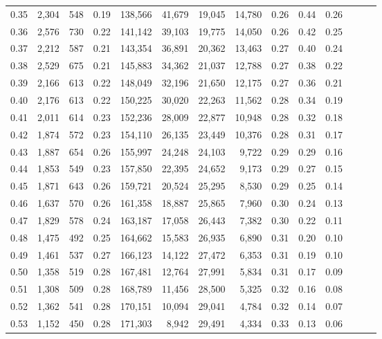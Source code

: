 \begin{tabular}{rrrrrrrrrrrrrr}
0.35 &  2,304 &    548 &  0.19 &  138,566 &   41,679 &  19,045 &  14,780 &  0.26 &  0.44 &      0.26 \\
0.36 &  2,576 &    730 &  0.22 &  141,142 &   39,103 &  19,775 &  14,050 &  0.26 &  0.42 &      0.25 \\
0.37 &  2,212 &    587 &  0.21 &  143,354 &   36,891 &  20,362 &  13,463 &  0.27 &  0.40 &      0.24 \\
0.38 &  2,529 &    675 &  0.21 &  145,883 &   34,362 &  21,037 &  12,788 &  0.27 &  0.38 &      0.22 \\
0.39 &  2,166 &    613 &  0.22 &  148,049 &   32,196 &  21,650 &  12,175 &  0.27 &  0.36 &      0.21 \\
0.40 &  2,176 &    613 &  0.22 &  150,225 &   30,020 &  22,263 &  11,562 &  0.28 &  0.34 &      0.19 \\
0.41 &  2,011 &    614 &  0.23 &  152,236 &   28,009 &  22,877 &  10,948 &  0.28 &  0.32 &      0.18 \\
0.42 &  1,874 &    572 &  0.23 &  154,110 &   26,135 &  23,449 &  10,376 &  0.28 &  0.31 &      0.17 \\
0.43 &  1,887 &    654 &  0.26 &  155,997 &   24,248 &  24,103 &   9,722 &  0.29 &  0.29 &      0.16 \\
0.44 &  1,853 &    549 &  0.23 &  157,850 &   22,395 &  24,652 &   9,173 &  0.29 &  0.27 &      0.15 \\
0.45 &  1,871 &    643 &  0.26 &  159,721 &   20,524 &  25,295 &   8,530 &  0.29 &  0.25 &      0.14 \\
0.46 &  1,637 &    570 &  0.26 &  161,358 &   18,887 &  25,865 &   7,960 &  0.30 &  0.24 &      0.13 \\
0.47 &  1,829 &    578 &  0.24 &  163,187 &   17,058 &  26,443 &   7,382 &  0.30 &  0.22 &      0.11 \\
0.48 &  1,475 &    492 &  0.25 &  164,662 &   15,583 &  26,935 &   6,890 &  0.31 &  0.20 &      0.10 \\
0.49 &  1,461 &    537 &  0.27 &  166,123 &   14,122 &  27,472 &   6,353 &  0.31 &  0.19 &      0.10 \\
0.50 &  1,358 &    519 &  0.28 &  167,481 &   12,764 &  27,991 &   5,834 &  0.31 &  0.17 &      0.09 \\
0.51 &  1,308 &    509 &  0.28 &  168,789 &   11,456 &  28,500 &   5,325 &  0.32 &  0.16 &      0.08 \\
0.52 &  1,362 &    541 &  0.28 &  170,151 &   10,094 &  29,041 &   4,784 &  0.32 &  0.14 &      0.07 \\
0.53 &  1,152 &    450 &  0.28 &  171,303 &    8,942 &  29,491 &   4,334 &  0.33 &  0.13 &      0.06 \\

\end{tabular}
